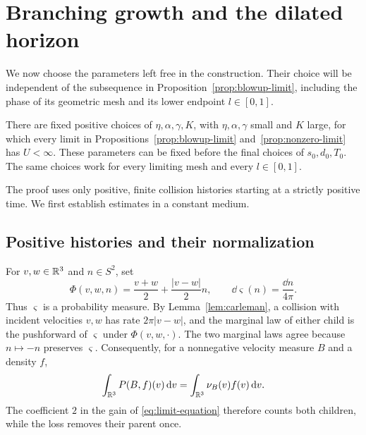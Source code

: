 \section{Branching growth and the dilated horizon}\label{sec:branching}

We now choose the parameters left free in the construction. Their choice
will be independent of the subsequence in
Proposition~\ref{prop:blowup-limit}, including the phase of its geometric
mesh and its lower endpoint \(l\in[0,1]\).

\begin{proposition}\label{prop:finite-dilated-horizon}
There are fixed positive choices of \(\eta,\alpha,\gamma,K\), with
\(\eta,\alpha,\gamma\) small and \(K\) large, for which every limit in
Propositions~\ref{prop:blowup-limit} and~\ref{prop:nonzero-limit} has
\(U<\infty\). These parameters can be fixed before the final choices of
\(s_0,d_0,T_0\). The same choices work for every limiting mesh and every
\(l\in[0,1]\).
\end{proposition}

The proof uses only positive, finite collision histories starting at a
strictly positive time. We first establish estimates in a constant medium.

\subsection{Positive histories and their normalization}

For \(v,w\in\mathbb R^3\) and \(n\in S^2\), set
\begin{equation}\label{br:sphere-map}
\Phi(v,w,n)=\frac{v+w}{2}+\frac{|v-w|}{2}n,
\qquad \dd\varsigma(n)=\frac{\dd n}{4\pi}.
\end{equation}
Thus \(\varsigma\) is a probability measure. By
Lemma~\ref{lem:carleman}, a collision with incident velocities \(v,w\)
has rate \(2\pi|v-w|\), and the marginal law of either child is the
pushforward of \(\varsigma\) under \(\Phi(v,w,\cdot)\). The two marginal
laws agree because \(n\mapsto-n\) preserves \(\varsigma\). Consequently,
for a nonnegative velocity measure \(B\) and a density \(f\),
\begin{equation}\label{br:gain-mass}
\int_{\mathbb R^3}P(B,f)(v)\,\mathrm d v=\int_{\mathbb R^3}\nu_B(v)f(v)\,\mathrm d v.
\end{equation}
The coefficient \(2\) in the gain of \eqref{eq:limit-equation} therefore
counts both children, while the loss removes their parent once.


